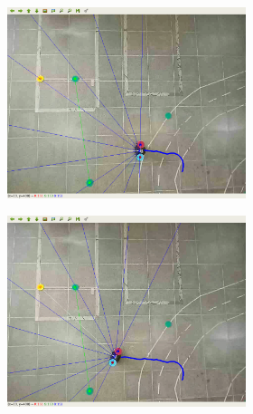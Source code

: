 \begin{figure}[H]
\begin{center}
\begin{subfigure}[b]{0.60\textwidth}
\begin{subfigure}[b]{0.24\textwidth}
        \end{subfigure}
        \hfill
        \begin{subfigure}[b]{0.24\textwidth}
            \includegraphics[width=\textwidth]{imagens/real_envs/real_env1_ddpg/3.png}
        \end{subfigure}
        \hfill
        \begin{subfigure}[b]{0.24\textwidth}
            \includegraphics[width=\textwidth]{imagens/real_envs/real_env1_ddpg/4.png}
        \end{subfigure}
        

\end{subfigure}
\end{center}
\end{figure}
